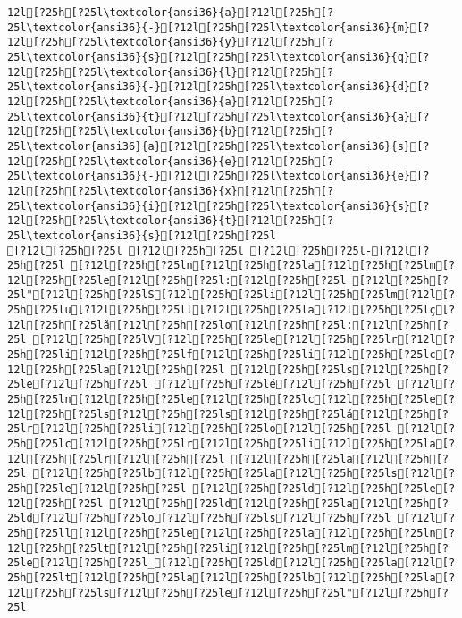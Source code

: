 \documentclass{scrartcl}
\begin{document}
\begin{Verbatim}
12l[?25h[?25l\textcolor{ansi36}{a}[?12l[?25h[?25l\textcolor{ansi36}{-}[?12l[?25h[?25l\textcolor{ansi36}{m}[?12l[?25h[?25l\textcolor{ansi36}{y}[?12l[?25h[?25l\textcolor{ansi36}{s}[?12l[?25h[?25l\textcolor{ansi36}{q}[?12l[?25h[?25l\textcolor{ansi36}{l}[?12l[?25h[?25l\textcolor{ansi36}{-}[?12l[?25h[?25l\textcolor{ansi36}{d}[?12l[?25h[?25l\textcolor{ansi36}{a}[?12l[?25h[?25l\textcolor{ansi36}{t}[?12l[?25h[?25l\textcolor{ansi36}{a}[?12l[?25h[?25l\textcolor{ansi36}{b}[?12l[?25h[?25l\textcolor{ansi36}{a}[?12l[?25h[?25l\textcolor{ansi36}{s}[?12l[?25h[?25l\textcolor{ansi36}{e}[?12l[?25h[?25l\textcolor{ansi36}{-}[?12l[?25h[?25l\textcolor{ansi36}{e}[?12l[?25h[?25l\textcolor{ansi36}{x}[?12l[?25h[?25l\textcolor{ansi36}{i}[?12l[?25h[?25l\textcolor{ansi36}{s}[?12l[?25h[?25l\textcolor{ansi36}{t}[?12l[?25h[?25l\textcolor{ansi36}{s}[?12l[?25h[?25l
[?12l[?25h[?25l [?12l[?25h[?25l [?12l[?25h[?25l-[?12l[?25h[?25l [?12l[?25h[?25ln[?12l[?25h[?25la[?12l[?25h[?25lm[?12l[?25h[?25le[?12l[?25h[?25l:[?12l[?25h[?25l [?12l[?25h[?25l"[?12l[?25h[?25lS[?12l[?25h[?25li[?12l[?25h[?25lm[?12l[?25h[?25lu[?12l[?25h[?25ll[?12l[?25h[?25la[?12l[?25h[?25lç[?12l[?25h[?25lã[?12l[?25h[?25lo[?12l[?25h[?25l:[?12l[?25h[?25l [?12l[?25h[?25lV[?12l[?25h[?25le[?12l[?25h[?25lr[?12l[?25h[?25li[?12l[?25h[?25lf[?12l[?25h[?25li[?12l[?25h[?25lc[?12l[?25h[?25la[?12l[?25h[?25l [?12l[?25h[?25ls[?12l[?25h[?25le[?12l[?25h[?25l [?12l[?25h[?25lé[?12l[?25h[?25l [?12l[?25h[?25ln[?12l[?25h[?25le[?12l[?25h[?25lc[?12l[?25h[?25le[?12l[?25h[?25ls[?12l[?25h[?25ls[?12l[?25h[?25lá[?12l[?25h[?25lr[?12l[?25h[?25li[?12l[?25h[?25lo[?12l[?25h[?25l [?12l[?25h[?25lc[?12l[?25h[?25lr[?12l[?25h[?25li[?12l[?25h[?25la[?12l[?25h[?25lr[?12l[?25h[?25l [?12l[?25h[?25la[?12l[?25h[?25l [?12l[?25h[?25lb[?12l[?25h[?25la[?12l[?25h[?25ls[?12l[?25h[?25le[?12l[?25h[?25l [?12l[?25h[?25ld[?12l[?25h[?25le[?12l[?25h[?25l [?12l[?25h[?25ld[?12l[?25h[?25la[?12l[?25h[?25ld[?12l[?25h[?25lo[?12l[?25h[?25ls[?12l[?25h[?25l [?12l[?25h[?25ll[?12l[?25h[?25le[?12l[?25h[?25la[?12l[?25h[?25ln[?12l[?25h[?25lt[?12l[?25h[?25li[?12l[?25h[?25lm[?12l[?25h[?25le[?12l[?25h[?25l_[?12l[?25h[?25ld[?12l[?25h[?25la[?12l[?25h[?25lt[?12l[?25h[?25la[?12l[?25h[?25lb[?12l[?25h[?25la[?12l[?25h[?25ls[?12l[?25h[?25le[?12l[?25h[?25l"[?12l[?25h[?25l

\end{Verbatim}
\end{document}
